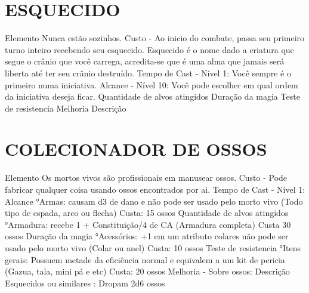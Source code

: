 \documentclass{article}%
\begin{document}
%
\section{ESQUECIDO}%
\label{sec:ESQUECIDO}%
Elemento Nunca estão sozinhos.\newline%
Custo {-} Ao inicio do combate, passa seu primeiro turno inteiro recebendo seu esquecido. Esquecido é o nome dado a criatura que segue o crânio que você carrega, acredita{-}se que é uma alma que jamais será liberta até ter seu crânio destruído.\newline%
Tempo de Cast {-} Nível 1:  Você sempre é o primeiro numa iniciativa.\newline%
Alcance {-} Nível 10:  Você pode escolher em qual ordem da iniciativa deseja ficar.\newline%
Quantidade de alvos atingidos \newline%
Duração da magia \newline%
Teste de resistencia \newline%
Melhoria \newline%
Descrição \newline%

%
\section{COLECIONADOR DE OSSOS}%
\label{sec:COLECIONADORDEOSSOS}%
Elemento Os mortos vivos são profissionais em manusear ossos.\newline%
Custo {-} Pode fabricar qualquer coisa usando ossos encontrados por ai.\newline%
Tempo de Cast {-} Nível 1:\newline%
Alcance °Armas: causam d3 de dano e não pode ser usado pelo morto vivo (Todo tipo de espada, arco ou flecha) Custa: 15 ossos\newline%
Quantidade de alvos atingidos °Armadura: recebe 1 + Constituição/4 de CA (Armadura completa) Custa 30 ossos\newline%
Duração da magia °Acessórios: +1 em um atributo colares não pode ser usado pelo morto vivo (Colar ou anel) Custa: 10 ossos\newline%
Teste de resistencia °Itens gerais: Possuem metade da eficiência normal e equivalem a um kit de pericia (Gazua, tala, mini pá e etc) Custa: 20 ossos\newline%
Melhoria {-} Sobre ossos:\newline%
Descrição Esquecidos ou similares : Dropam 2d6 ossos\newline%
\end{document}
